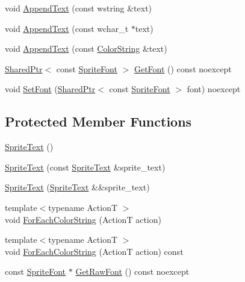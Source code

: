 \begin{DoxyCompactItemize}
\item 
void \hyperlink{classmage_1_1_sprite_text_acf993532a7b2e6ebb761b9b47cbdba98}{Append\+Text} (const wstring \&text)
\item 
void \hyperlink{classmage_1_1_sprite_text_a462809b9138f94720f972505a4f74d81}{Append\+Text} (const wchar\+\_\+t $\ast$text)
\item 
void \hyperlink{classmage_1_1_sprite_text_a914e7f755cf8b6ddd22dd66c9108029b}{Append\+Text} (const \hyperlink{classmage_1_1_color_string}{Color\+String} \&text)
\item 
\hyperlink{namespacemage_a1e01ae66713838a7a67d30e44c67703e}{Shared\+Ptr}$<$ const \hyperlink{classmage_1_1_sprite_font}{Sprite\+Font} $>$ \hyperlink{classmage_1_1_sprite_text_aa1aab1690f37220babce2639463bd7d5}{Get\+Font} () const noexcept
\item 
void \hyperlink{classmage_1_1_sprite_text_a46235c90d3fc9872c2342cd17eaa9e89}{Set\+Font} (\hyperlink{namespacemage_a1e01ae66713838a7a67d30e44c67703e}{Shared\+Ptr}$<$ const \hyperlink{classmage_1_1_sprite_font}{Sprite\+Font} $>$ font) noexcept
\end{DoxyCompactItemize}
\subsection*{Protected Member Functions}
\begin{DoxyCompactItemize}
\item 
\hyperlink{classmage_1_1_sprite_text_ae55645d53a2f774703603139a80dd84b}{Sprite\+Text} ()
\item 
\hyperlink{classmage_1_1_sprite_text_a3e56a7882dd714a6d8f2452d4f7071ff}{Sprite\+Text} (const \hyperlink{classmage_1_1_sprite_text}{Sprite\+Text} \&sprite\+\_\+text)
\item 
\hyperlink{classmage_1_1_sprite_text_ab03ba1fb607ce86d28b742fc020c8a62}{Sprite\+Text} (\hyperlink{classmage_1_1_sprite_text}{Sprite\+Text} \&\&sprite\+\_\+text)
\item 
{\footnotesize template$<$typename ActionT $>$ }\\void \hyperlink{classmage_1_1_sprite_text_ad975957b908ad3926ace75fb60ff4474}{For\+Each\+Color\+String} (ActionT action)
\item 
{\footnotesize template$<$typename ActionT $>$ }\\void \hyperlink{classmage_1_1_sprite_text_abc70368fd800a82cbd1ec31f51d4db17}{For\+Each\+Color\+String} (ActionT action) const
\item 
const \hyperlink{classmage_1_1_sprite_font}{Sprite\+Font} $\ast$ \hyperlink{classmage_1_1_sprite_text_ab3124ee856ef6da31745af152840a8ce}{Get\+Raw\+Font} () const noexcept
\end{DoxyCompactItemize}
